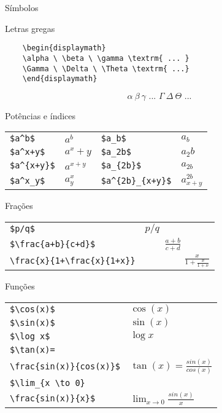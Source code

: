 \begin{frame}{Símbolos}
    \begin{block}{Letras gregas}
    \small{
\begin{verbatim}
    \begin{displaymath}
    \alpha \ \beta \ \gamma \textrm{ ... } 
    \Gamma \ \Delta \ \Theta \textrm{ ...}
    \end{displaymath}
\end{verbatim}
    \begin{displaymath}
    \alpha \  \beta \ \gamma \textrm{ ... }
    \Gamma \ \Delta \ \Theta \textrm{ ...}
    \end{displaymath}
        }
    \end{block}

    \begin{block}{Potências e índices}
    \small{
    \begin{tabular}{l l l l}
    \verb|$a^b$|        & $a^b$     & \verb|$a_b$|          & $a_b$         \\
    \verb|$a^x+y$|      & $a^x+y$   & \verb|$a_2b$|         & $a_2b$        \\
    \verb|$a^{x+y}$|    & $a^{x+y}$ & \verb|$a_{2b}$|       & $a_{2b}$      \\
    \verb|$a^x_y$|      & $a^x_y$   & \verb|$a^{2b}_{x+y}$| & $a^{2b}_{x+y}$
    \end{tabular}
    }
    \end{block}

    \begin{block}{Frações}
    \small{
    \begin{tabular}{l l}
    \verb|$p/q$|                        & $p/q$ \\
    \verb|$\frac{a+b}{c+d}$|            & $\qquad \frac{a+b}{c+d}$ \\
    \verb|\frac{x}{1+\frac{x}{1+x}}|    & $\qquad \qquad \frac{x}{1+\frac{x}{1+x}}$
    \end{tabular}
    }
    \end{block}

    \begin{block}{Funções}
     \small{
    \begin{tabular}{l l}
    \verb|$\cos(x)$|    & $\cos(x)$  \\
    \verb|$\sin(x)$|    & $\sin(x)$ \\
    \verb|$\log x$|     & $\log x$ \\
    \verb|$\tan(x)=| \\ \verb|\frac{sin(x)}{cos(x)}$|    & $\tan(x) = \frac{sin(x)}{cos(x)}$ \\
    \verb|$\lim_{x \to 0} | \\ \verb|\frac{sin(x)}{x}$|  & $\lim_{x \to 0} \frac{sin(x)}{x}$
    \end{tabular}
    }
    \end{block}

\end{frame}

